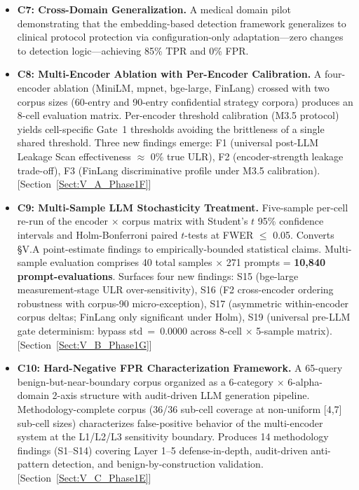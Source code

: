 \documentclass[journal]{IEEEtran}
\begin{document}
\begin{itemize}
    \item \textbf{C7: Cross-Domain Generalization.}
    A medical domain pilot demonstrating that the embedding-based detection framework generalizes to clinical protocol protection via configuration-only adaptation---zero changes to detection logic---achieving 85\% TPR and 0\% FPR.

    \item \textbf{C8: Multi-Encoder Ablation with Per-Encoder Calibration.}
    A four-encoder ablation (MiniLM, mpnet, bge-large, FinLang) crossed with two corpus sizes (60-entry and 90-entry confidential strategy corpora) produces an 8-cell evaluation matrix. Per-encoder threshold calibration (M3.5 protocol) yields cell-specific Gate~1 thresholds avoiding the brittleness of a single shared threshold. Three new findings emerge: F1 (universal post-LLM Leakage Scan effectiveness $\approx$ 0\% true ULR), F2 (encoder-strength leakage trade-off), F3 (FinLang discriminative profile under M3.5 calibration). [Section~\ref{Sect:V_A_Phase1F}]

    \item \textbf{C9: Multi-Sample LLM Stochasticity Treatment.}
    Five-sample per-cell re-run of the encoder $\times$ corpus matrix with Student's $t$ 95\% confidence intervals and Holm-Bonferroni paired $t$-tests at FWER $\leq$ 0.05. Converts \S V.A point-estimate findings to empirically-bounded statistical claims. Multi-sample evaluation comprises 40 total samples $\times$ 271 prompts = \textbf{10,840 prompt-evaluations}. Surfaces four new findings: S15 (bge-large measurement-stage ULR over-sensitivity), S16 (F2 cross-encoder ordering robustness with corpus-90 micro-exception), S17 (asymmetric within-encoder corpus deltas; FinLang only significant under Holm), S19 (universal pre-LLM gate determinism: bypass std~=~0.0000 across 8-cell $\times$ 5-sample matrix). [Section~\ref{Sect:V_B_Phase1G}]

    \item \textbf{C10: Hard-Negative FPR Characterization Framework.}
    A 65-query benign-but-near-boundary corpus organized as a 6-category $\times$ 6-alpha-domain 2-axis structure with audit-driven LLM generation pipeline. Methodology-complete corpus (36/36 sub-cell coverage at non-uniform [4,7] sub-cell sizes) characterizes false-positive behavior of the multi-encoder system at the L1/L2/L3 sensitivity boundary. Produces 14 methodology findings (S1--S14) covering Layer 1--5 defense-in-depth, audit-driven anti-pattern detection, and benign-by-construction validation. [Section~\ref{Sect:V_C_Phase1E}]


\end{itemize}
\end{document}
